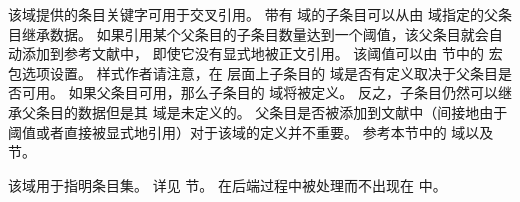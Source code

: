 \begin{fieldlist}




该域提供的条目关键字可用于交叉引用。
带有  域的子条目可以从由  域指定的父条目继承数据。
如果引用某个父条目的子条目数量达到一个阈值，该父条目就会自动添加到参考文献中，
即使它没有显式地被正文引用。
该阈值可以由  节中的  宏包选项设置。
样式作者请注意，在 \biblatex 层面上子条目的  域是否有定义取决于父条目是否可用。
如果父条目可用，那么子条目的  域将被定义。
反之，子条目仍然可以继承父条目的数据但是其  域是未定义的。
父条目是否被添加到文献中（间接地由于阈值或者直接被显式地引用）对于该域的定义并不重要。
参考本节中的  域以及  节。




该域用于指明条目集。
详见  节。
在后端过程中被处理而不出现在  中。


\end{fieldlist}
